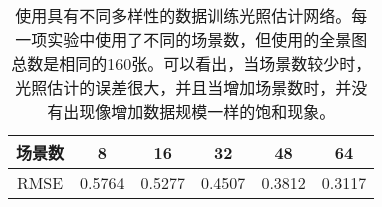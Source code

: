 \begin{table}[htbp]
    \centering
    \begin{tabular}{c|c|c|c|c|c}
        \toprule
    场景数& 8       &  16  & 32  & 48  & 64 \\\hline
    RMSE &  0.5764 & 0.5277 & 0.4507 & 0.3812 & 0.3117\\
        \bottomrule
    \end{tabular}
    \caption[数据多样性对光照估计的影响]{
        \label{table:eval-data-diversity}
        使用具有不同多样性的数据训练光照估计网络。每一项实验中使用了不同的场景数，但使用的全景图总数是相同的160张。可以看出，当场景数较少时，光照估计的误差很大，并且当增加场景数时，并没有出现像增加数据规模一样的饱和现象。
    }
\end{table}